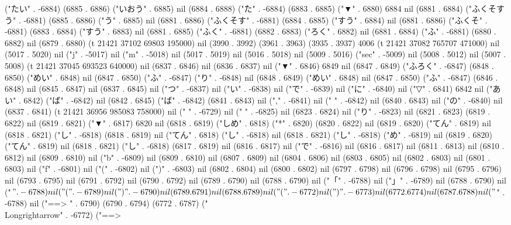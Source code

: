 ("たい" . -6884) (6885 . 6886) ("いおう" . 6885) nil (6884 . 6888) ("た" . -6884) (6883 . 6885) ("▼" . 6880) 6884 nil (6881 . 6884) ("ふくそすう" . -6881) (6885 . 6886) ("う" . 6885) nil (6881 . 6886) ("ふくそす" . -6881) (6884 . 6885) ("すう" . 6884) nil (6881 . 6886) ("ふくそ" . -6881) (6883 . 6884) ("すう" . 6883) nil (6881 . 6885) ("ふく" . -6881) (6882 . 6883) ("ろく" . 6882) nil (6881 . 6884) ("ふ" . -6881) (6880 . 6882) nil (6879 . 6880) (t 21421 37102 69803 195000) nil (3990 . 3992) (3961 . 3963) (3935 . 3937) 4006 (t 21421 37082 765707 471000) nil (5017 . 5020) nil ("j" . -5017) nil ("m" . -5018) nil (5017 . 5019) nil (5016 . 5018) nil (5009 . 5016) ("sec" . -5009) nil (5008 . 5012) nil (5007 . 5008) (t 21421 37045 693523 640000) nil (6837 . 6846) nil (6836 . 6837) nil ("▼" . 6846) 6849 nil (6847 . 6849) ("ふろく" . -6847) (6848 . 6850) ("めい" . 6848) nil (6847 . 6850) ("ふ" . -6847) ("り" . -6848) nil (6848 . 6849) ("めい" . 6848) nil (6847 . 6850) ("ふ" . -6847) (6846 . 6848) nil (6845 . 6847) nil (6837 . 6845) nil ("つ" . -6837) nil ("い" . -6838) nil ("で" . -6839) nil ("に" . -6840) nil ("▽" . 6841) 6842 nil ("あい" . 6842) ("ば" . -6842) nil (6842 . 6845) ("ば" . -6842) (6841 . 6843) nil ("," . -6841) nil (" " . -6842) nil (6840 . 6843) nil ("の" . -6840) nil (6837 . 6841) (t 21421 36956 985083 758000) nil (" " . -6729) nil (" " . -6825) nil (6823 . 6824) nil ("り" . -6823) nil (6821 . 6823) (6819 . 6822) nil (6819 . 6821) ("▼" . 6817) 6820 nil (6818 . 6819) ("しめ" . 6818) ("*" . 6820) (6820 . 6822) nil (6819 . 6820) ("てん" . 6819) nil (6818 . 6821) ("し" . -6818) (6818 . 6819) nil ("てん" . 6818) ("し" . -6818) nil (6818 . 6821) ("し" . -6818) ("め" . -6819) nil (6819 . 6820) ("てん" . 6819) nil (6818 . 6821) ("し" . -6818) (6817 . 6819) nil (6816 . 6817) nil ("で" . -6816) nil (6816 . 6817) nil (6811 . 6813) nil (6810 . 6812) nil (6809 . 6810) nil ("b" . -6809) nil (6809 . 6810) nil (6807 . 6809) nil (6804 . 6806) nil (6803 . 6805) nil (6802 . 6803) nil (6801 . 6803) nil ("f" . -6801) nil ("(" . -6802) nil (")" . -6803) nil (6802 . 6804) nil (6800 . 6802) nil (6797 . 6798) nil (6796 . 6798) nil (6795 . 6796) nil (6793 . 6795) nil (6791 . 6792) nil (6790 . 6792) nil (6789 . 6790) nil (6788 . 6790) nil ("「" . -6788) nil ("」" . -6789) nil (6788 . 6790) nil ("$" . -6788) nil ("(" . -6789) nil (")" . -6790) nil (6789 . 6791) nil (6788 . 6789) nil ("(" . -6772) nil (")" . -6773) nil (6772 . 6774) nil (6787 . 6788) nil ("$" . -6788) nil ("==>
" . 6790) (6790 . 6794) (6772 . 6787) ("\\Longrightarrow" . -6772) ("==>
